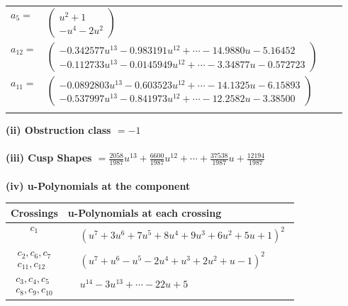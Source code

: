 \documentclass[1p]{elsarticle_modified}
\theoremstyle{definition}
\begin{document}
\begin{tabular}{m{7pt} m{180pt} m{7pt} m{180pt} }
\flushright $a_{5}=$&$\begin{pmatrix}u^2+1\\- u^4-2 u^2\end{pmatrix}$ \\
\flushright $a_{12}=$&$\begin{pmatrix}-0.342577 u^{13}-0.983191 u^{12}+\cdots-14.9880 u-5.16452\\-0.112733 u^{13}-0.0145949 u^{12}+\cdots-3.34877 u-0.572723\end{pmatrix}$ \\
\flushright $a_{11}=$&$\begin{pmatrix}-0.0892803 u^{13}-0.603523 u^{12}+\cdots-14.1325 u-6.15893\\-0.537997 u^{13}-0.841973 u^{12}+\cdots-12.2582 u-3.38500\end{pmatrix}$\\&\end{tabular}
\flushleft \textbf{(ii) Obstruction class $= -1$}\\~\\
\flushleft \textbf{(iii) Cusp Shapes $= \frac{2058}{1987} u^{13}+\frac{6600}{1987} u^{12}+\cdots+\frac{37538}{1987} u+\frac{12194}{1987}$}\\~\\
\newpage\renewcommand{\arraystretch}{1}
\flushleft \textbf{(iv) u-Polynomials at the component}\newline \\
\begin{tabular}{m{50pt}|m{274pt}}
Crossings & \hspace{64pt}u-Polynomials at each crossing \\
\hline $$\begin{aligned}c_{1}\end{aligned}$$&$\begin{aligned}
&(u^7+3 u^6+7 u^5+8 u^4+9 u^3+6 u^2+5 u+1)^2
\end{aligned}$\\
\hline $$\begin{aligned}c_{2},c_{6},c_{7}\\c_{11},c_{12}\end{aligned}$$&$\begin{aligned}
&(u^7+u^6- u^5-2 u^4+u^3+2 u^2+u-1)^2
\end{aligned}$\\
\hline $$\begin{aligned}c_{3},c_{4},c_{5}\\c_{8},c_{9},c_{10}\end{aligned}$$&$\begin{aligned}
&u^{14}-3 u^{13}+\cdots-22 u+5
\end{aligned}$\\
\hline
\end{tabular}\\~\\
\end{document}
